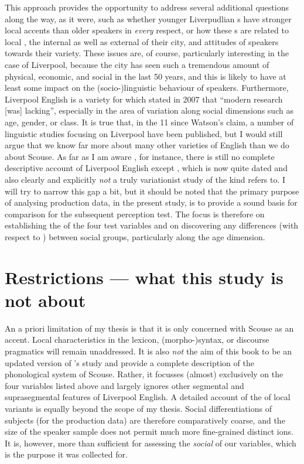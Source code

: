 This approach provides the opportunity to address several additional questions along the way, as it were, such as whether younger Liverpudlian s have stronger local accents than older speakers in \emph{every} respect, or how these s are related to local , the internal as well as external  of their city, and attitudes of speakers towards their variety.
These issues are, of course, particularly interesting in the case of Liverpool, because the city has seen such a tremendous amount of physical, economic, and social  in the last 50 years, and this is likely to have at least some impact on the (socio-)linguistic behaviour of speakers.
Furthermore, Liverpool English is a variety for which \textcite[351]{watson2007} stated in 2007 that ``modern research [was] lacking'', especially in the area of variation along social dimensions such as age, gender, or class.
It is true that, in the 11 since Watson's claim, a number of linguistic studies focusing on Liverpool have been published, but I would still argue that we know far more about many other varieties of English than we do about Scouse.
As far as I am aware , for instance, there is still no complete descriptive account of Liverpool English except \cite{knowles1973}, which is now quite dated and also clearly and explicitly \emph{not} a truly variationist study of the kind \textcite{watson2007} refers to.
I will try to narrow this gap a bit, but it should be noted that the primary purpose of analysing production data, in the present study, is to provide a sound basis for comparison for the subsequent perception test.
The focus is therefore on establishing the  of the four test variables and on discovering any differences (with respect to ) between social groups, particularly along the age dimension.

\section{Restrictions --- what this study is not about}
\label{sec.intro.restrict}

An a priori limitation  of my thesis is that it is only concerned with Scouse as an accent.
Local characteristics in the lexicon, (morpho-)syntax, or discourse pragmatics will remain unaddressed.
It is also \emph{not} the aim of this book to be an updated version of \citeauthor{knowles1973}'s \citeyear{knowles1973} study and provide a complete description of the phonological system of Scouse.
Rather, it focusses (almost) exclusively on the four variables listed above and largely ignores other segmental and suprasegmental features of Liverpool English.
A detailed account of the  of local variants is equally beyond the scope of my thesis.
Social differentiations of subjects (for the production data) are therefore comparatively coarse, and the size of the speaker sample does not permit much more fine-grained distinct ions.
It is, however, more than sufficient for assessing the \emph{social } of our variables, which is the purpose it was collected for.

